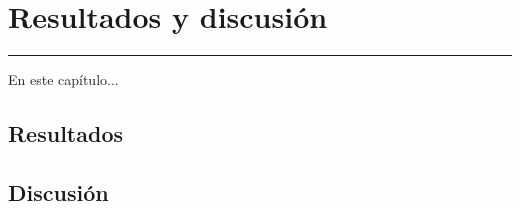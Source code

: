 \chapter{Resultados y discusión} \label{chap:Resultados}
\hrule
\vspace{3mm}

En este capítulo...


\section{Resultados}


\section{Discusión}
